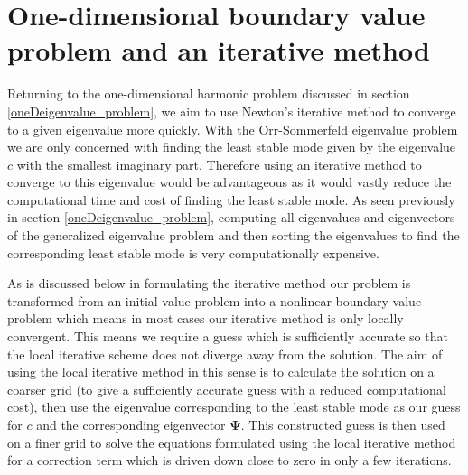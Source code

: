 \documentclass[a4paper, 12pt, twoside, openright]{article}
\numberwithin{equation}{section}
\begin{document}
%
%
%
%
\newpage
\section{One-dimensional boundary value problem and an iterative method}

%
%
%
%

Returning to the one-dimensional harmonic problem discussed in section \ref{oneDeigenvalue_problem}, we aim to use Newton's iterative method to converge to a given eigenvalue more quickly. With the Orr-Sommerfeld eigenvalue problem we are only concerned with finding the least stable mode given by the eigenvalue $c$ with the smallest imaginary part. Therefore using an iterative method to converge to this eigenvalue would be advantageous as it would vastly reduce the computational time and cost of finding the least stable mode. As seen previously in section \ref{oneDeigenvalue_problem}, computing all eigenvalues and eigenvectors of the generalized eigenvalue problem and then sorting the eigenvalues to find the corresponding least stable mode is very computationally expensive.%

As is discussed below in formulating the iterative method our problem is transformed from an initial-value problem into a nonlinear boundary value problem which means in most cases our iterative method is only locally convergent. This means we require a guess which is sufficiently accurate so that the local iterative scheme does not diverge away from the solution. The aim of using the local iterative method in this sense is to calculate the solution on a coarser grid (to give a sufficiently accurate guess with a reduced computational cost), then use the eigenvalue corresponding to the least stable mode as our guess for $c$ and the corresponding eigenvector $\mathbf{\Psi}$. This constructed guess is then used on a finer grid to solve the equations formulated using the local iterative method for a correction term which is driven down close to zero in only a few iterations.%
\end{document}
